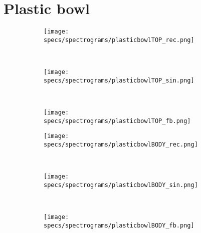 \section*{Plastic bowl}

\begin{figure}[H]
    \centering
    \begin{subfigure}[b]{0.25\textwidth}
        \texttt{[image: specs/spectrograms/plasticbowlTOP\_rec.png]}
    \end{subfigure}%
    ~ %
    \begin{subfigure}[b]{0.25\textwidth}
        \texttt{[image: specs/spectrograms/plasticbowlTOP\_sin.png]}
    \end{subfigure}%
    ~ %
    \begin{subfigure}[b]{0.25\textwidth}
        \texttt{[image: specs/spectrograms/plasticbowlTOP\_fb.png]}
    \end{subfigure}%
      
    \begin{subfigure}[b]{0.25\textwidth}
        \texttt{[image: specs/spectrograms/plasticbowlBODY\_rec.png]}
    \end{subfigure}%
    ~ %
    \begin{subfigure}[b]{0.25\textwidth}
        \texttt{[image: specs/spectrograms/plasticbowlBODY\_sin.png]}
    \end{subfigure}%
    ~ %
    \begin{subfigure}[b]{0.25\textwidth}
        \texttt{[image: specs/spectrograms/plasticbowlBODY\_fb.png]}
    \end{subfigure}%
      

\end{figure}
